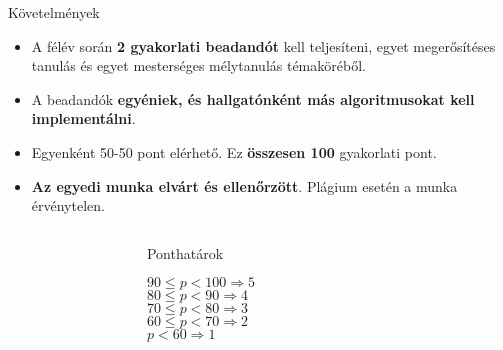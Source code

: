 \documentclass[english, aspectratio=169]{beamer}
\begin{document}
\begin{frame}{Követelmények}
\begin{itemize}
	\item A félév során \textbf{2 gyakorlati beadandót} kell teljesíteni, egyet megerősítéses tanulás és egyet mesterséges mélytanulás témaköréből. 
	\item A beadandók \textbf{egyéniek, és hallgatónként más algoritmusokat kell implementálni}.
	\item Egyenként 50-50 pont elérhető. Ez \textbf{összesen 100} gyakorlati pont. 
	\item \textbf{Az egyedi munka elvárt és ellenőrzött}. Plágium esetén a munka érvénytelen. 
\end{itemize}
\par\smallskip
	\begin{columns}
	\begin{column}{.3\textwidth}
		\end{column}
			\begin{column}{.3\textwidth}
				\begin{block}{\begin{center}Ponthatárok\end{center}}
					\begin{center}
						$90 \leq p < 100 \Rightarrow 5$\\
						$80 \leq p < 90 \Rightarrow 4$\\
						$70 \leq p < 80 \Rightarrow 3$\\
						$60 \leq p < 70 \Rightarrow 2$\\
						$p < 60 \Rightarrow 1$
					\end{center}
				\end{block}
			\end{column}
		\begin{column}{.3\textwidth}
		\end{column}
	\end{columns}
\end{frame}
\end{document}
